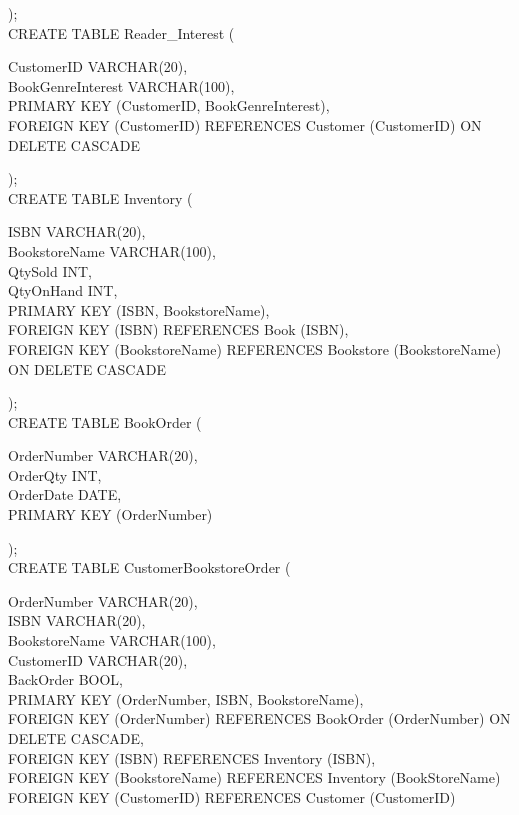\documentclass{scrreprt}
\begin{document}
);\\
CREATE TABLE Reader_Interest
(
\begin{adjustwidth}{1cm}{0cm}
    CustomerID        VARCHAR(20),\\
    BookGenreInterest VARCHAR(100),\\
    PRIMARY KEY (CustomerID, BookGenreInterest),\\
    FOREIGN KEY (CustomerID) REFERENCES Customer (CustomerID)
        ON DELETE CASCADE
\end{adjustwidth}
);\\
CREATE TABLE Inventory
(
\begin{adjustwidth}{1cm}{0cm}
    ISBN          VARCHAR(20),\\
    BookstoreName VARCHAR(100),\\
    QtySold       INT,\\
    QtyOnHand     INT,\\
    PRIMARY KEY (ISBN, BookstoreName),\\
    FOREIGN KEY (ISBN) REFERENCES Book (ISBN),\\
    FOREIGN KEY (BookstoreName) REFERENCES Bookstore (BookstoreName)
        ON DELETE CASCADE
\end{adjustwidth}
);\\
CREATE TABLE BookOrder
(
\begin{adjustwidth}{1cm}{0cm}
    OrderNumber VARCHAR(20),\\
    OrderQty    INT,\\
    OrderDate   DATE,\\
    PRIMARY KEY (OrderNumber)
\end{adjustwidth}
);\\
CREATE TABLE CustomerBookstoreOrder
(
\begin{adjustwidth}{1cm}{0cm}
    OrderNumber   VARCHAR(20),\\
    ISBN          VARCHAR(20),\\
    BookstoreName VARCHAR(100),\\
    CustomerID    VARCHAR(20),\\
    BackOrder     BOOL,\\
    PRIMARY KEY (OrderNumber, ISBN, BookstoreName),\\
    FOREIGN KEY (OrderNumber) REFERENCES BookOrder (OrderNumber) ON DELETE CASCADE,\\
    FOREIGN KEY (ISBN) REFERENCES Inventory (ISBN),\\
    FOREIGN KEY (BookstoreName) REFERENCES Inventory (BookStoreName)\\
    FOREIGN KEY (CustomerID) REFERENCES Customer (CustomerID)
\end{adjustwidth}
\end{document}

